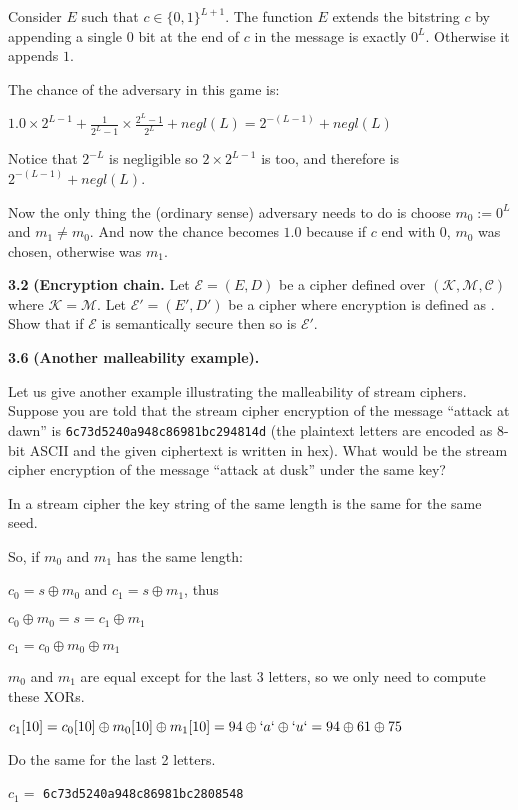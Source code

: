 \begin{tcolorbox}[solutionbox, title=Answer: (b)]
    Consider $E$ such that $c \in \{0,  1\}^{L + 1}$.
    The function $E$ extends the bitstring $c$ by appending a single $0$ bit at the end of $c$ in the message is exactly $0^L$. Otherwise it appends $1$.

    The chance of the adversary in this game is:

    $1.0 \times 2^{L-1} + \frac{1}{2^L - 1} \times \frac{2^L - 1}{2^L} + negl(L) = 2^{-(L-1)} + negl(L)$
    

    Notice that $2^{-L}$ is negligible so $2 \times 2^{L-1}$ is too, and therefore is $2^{-(L-1)} + negl(L)$.
    \vspace{1em}

    Now the only thing the (ordinary sense) adversary needs to do is choose $m_0 := 0^L$ and $m_1 \neq m_0$.
    And now the chance becomes $1.0$ because if $c$ end with $0$, $m_0$ was chosen, otherwise was $m_1$.
\end{tcolorbox}



\newpage
\noindent
\textbf{3.2}
\textbf{(Encryption chain.} Let $\mathcal{E} = (E, D)$ be a cipher defined over $(\mathcal{K},\mathcal{M},\mathcal{C})$ where $\mathcal{K} = \mathcal{M}$.
Let $\mathcal{E'} = (E', D')$ be a cipher where encryption is defined as $ $. Show that if $\mathcal{E}$ is semantically secure then so is $\mathcal{E}'$.

\begin{tcolorbox}[solutionbox, title=Answer]

\end{tcolorbox}


\newpage
\noindent
\textbf{3.6}
\textbf{(Another malleability example).}

Let us give another example illustrating the malleability of stream ciphers.
Suppose you are told that the stream cipher encryption of the message
``attack at dawn'' is
\texttt{6c73d5240a948c86981bc294814d}
(the plaintext letters are encoded as 8-bit ASCII and
the given ciphertext is written in hex).
What would be the stream cipher encryption of the message
``attack at dusk'' under the same key?
\begin{tcolorbox}[solutionbox, title=Answer]

In a stream cipher the key string of the same length is the same for the same seed.

So, if $m_0$ and $m_1$ has the same length:

$c_0 = s\oplus m_0$ and $c_1 = s \oplus m_1$, thus

$c_0 \oplus m_0 = s = c_1 \oplus m_1$

$c_1 = c_0 \oplus m_0 \oplus m_1$

$m_0$ and $m_1$ are equal except for the last 3 letters, so we only need to compute these XORs.

$c_1[10] = c_0[10] \oplus m_0[10] \oplus m_1[10] = 94 \oplus `a` \oplus `u` = 94 \oplus 61 \oplus 75$

Do the same for the last 2 letters.

$c_1 =$ \texttt{6c73d5240a948c86981bc2808548}

\end{tcolorbox}


